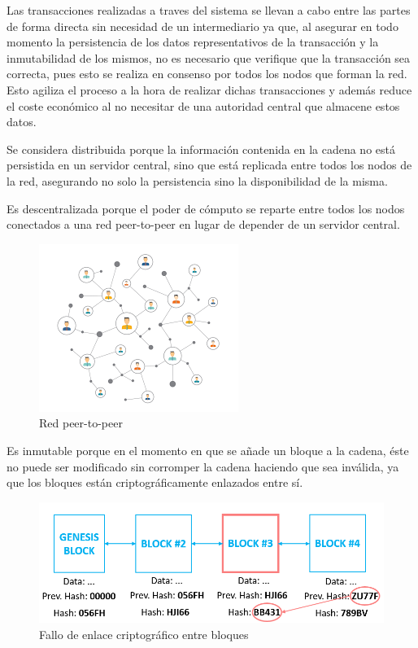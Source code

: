 \documentclass[12pt]{report}
\begin{document}
Las transacciones realizadas a traves del sistema se llevan a cabo entre las partes de forma directa sin necesidad de un intermediario ya que, al asegurar en todo momento la persistencia de los datos representativos de la transacción y la inmutabilidad de los mismos, no es necesario que verifique que la transacción sea correcta, pues esto se realiza en consenso por todos los nodos que forman la red. Esto agiliza el proceso a la hora de realizar dichas transacciones y además reduce el coste económico al no necesitar de una autoridad central que almacene estos datos.

Se considera distribuida porque la información contenida en la cadena no está persistida en un servidor central, sino que está replicada entre todos los nodos de la red, asegurando no solo la persistencia sino la disponibilidad de la misma.

Es descentralizada porque el poder de cómputo se reparte entre todos los nodos conectados a una red peer-to-peer en lugar de depender de un servidor central.
\begin{figure}[h]
\includegraphics[scale=0.7]{network}
\caption{Red peer-to-peer}
\centering
\end{figure}

Es inmutable porque en el momento en que se añade un bloque a la cadena, éste no puede ser modificado sin corromper la cadena haciendo que sea inválida, ya que los bloques están criptográficamente enlazados entre sí.

\begin{figure}[h]
\includegraphics[scale=0.5]{immutable}
\caption{Fallo de enlace criptográfico entre bloques}
\centering
\end{figure}
\end{document}
